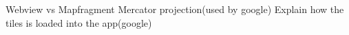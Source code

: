 
Webview vs Mapfragment
Mercator projection(used by google)
Explain how the tiles is loaded into the app(google)